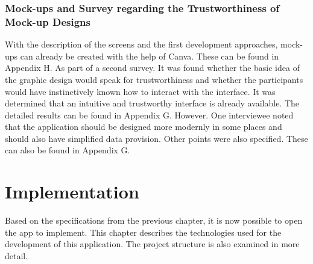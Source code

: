 \subsection{Mock-ups and Survey regarding the Trustworthiness of Mock-up Designs}
With the description of the screens and the first development approaches, mock-ups can already be created with the help of Canva. These can be found in Appendix H. As part of a second survey. It was found whether the basic idea of the graphic design would speak for trustworthiness and whether the participants would have instinctively known how to interact with the interface. It was determined that an intuitive and trustworthy interface is already available. The detailed results can be found in Appendix G. However. One interviewee noted that the application should be designed more modernly in some places and should also have simplified data provision. Other points were also specified. These can also be found in Appendix G.

\chapter{Implementation}
Based on the specifications from the previous chapter, it is now possible to open the app to implement. This chapter describes the technologies used for the development of this application. The project structure is also examined in more detail.
